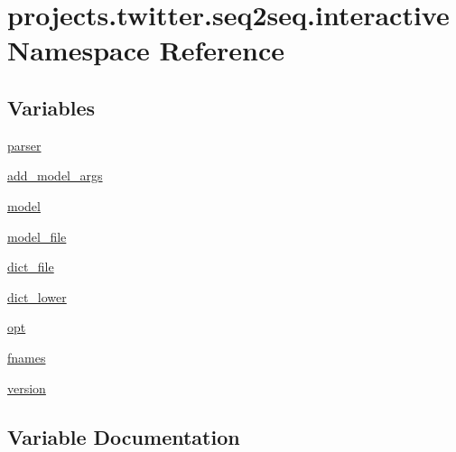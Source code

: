 \hypertarget{namespaceprojects_1_1twitter_1_1seq2seq_1_1interactive}{}\section{projects.\+twitter.\+seq2seq.\+interactive Namespace Reference}
\label{namespaceprojects_1_1twitter_1_1seq2seq_1_1interactive}
\subsection*{Variables}
\begin{DoxyCompactItemize}
\item 
\hyperlink{namespaceprojects_1_1twitter_1_1seq2seq_1_1interactive_acec6c52128a1d95d140ca9cd1e82b16d}{parser}
\item 
\hyperlink{namespaceprojects_1_1twitter_1_1seq2seq_1_1interactive_ace9452812c510cb14b2203a52777cb88}{add\+\_\+model\+\_\+args}
\item 
\hyperlink{namespaceprojects_1_1twitter_1_1seq2seq_1_1interactive_abad93075dec6236791fba95c3df1846a}{model}
\item 
\hyperlink{namespaceprojects_1_1twitter_1_1seq2seq_1_1interactive_a4c9deb4c51f585c6b7d3e8d0b752c370}{model\+\_\+file}
\item 
\hyperlink{namespaceprojects_1_1twitter_1_1seq2seq_1_1interactive_a5d2cbf4751399c82269a4297433f25da}{dict\+\_\+file}
\item 
\hyperlink{namespaceprojects_1_1twitter_1_1seq2seq_1_1interactive_a1fff7ce0ab79211a6010326e739474f2}{dict\+\_\+lower}
\item 
\hyperlink{namespaceprojects_1_1twitter_1_1seq2seq_1_1interactive_a7d4ee83d3b3bdf88e548b4c3550e057e}{opt}
\item 
\hyperlink{namespaceprojects_1_1twitter_1_1seq2seq_1_1interactive_ad6aa507e2672f5cd8955efedecebecc4}{fnames}
\item 
\hyperlink{namespaceprojects_1_1twitter_1_1seq2seq_1_1interactive_a38d3b91fe6745c930dcda52bb7f6fd53}{version}
\end{DoxyCompactItemize}


\subsection{Variable Documentation}
\mbox{\label{namespaceprojects_1_1twitter_1_1seq2seq_1_1interactive_ace9452812c510cb14b2203a52777cb88}} 
